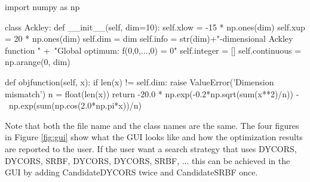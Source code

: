 \documentclass[]{article}
\begin{document}
\begin{python}
import numpy as np

class Ackley:
    def __init__(self, dim=10):
        self.xlow = -15 * np.ones(dim)
        self.xup = 20 * np.ones(dim)
        self.dim = dim
        self.info = str(dim)+"-dimensional Ackley function \n" +\
                             "Global optimum: f(0,0,...,0) = 0"
        self.integer = []
        self.continuous = np.arange(0, dim)

    def objfunction(self, x):
        if len(x) != self.dim:
            raise ValueError('Dimension mismatch')
        n = float(len(x))
        return -20.0 * np.exp(-0.2*np.sqrt(sum(x**2)/n)) - \
        		      np.exp(sum(np.cos(2.0*np.pi*x))/n)
\end{python}
Note that both the file name and the class names are the same.
\FloatBarrier
The four figures in Figure \ref{fig:gui} show what the GUI looks like and how the optimization results are reported to the user. If the user want a search strategy that uses DYCORS, DYCORS, SRBF, DYCORS, DYCORS, SRBF, ... this can be achieved in the GUI by adding CandidateDYCORS twice and CandidateSRBF once.
\end{document}
